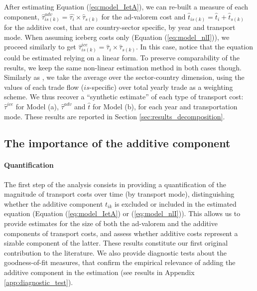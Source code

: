 \documentclass[a4paper,11pt]{article}
\begin{document}


After estimating Equation (\ref{eq:model_IetA}), we can re-built a measure of each component, $\widehat{\tau}^{adv}_{is(k)} = \widehat{\tau_{i}} \times \widehat{\tau}_{s(k)}$ for the ad-valorem cost and $\widehat{t}_{is(k)} = \widehat{t}_{i} + \widehat{t}_{s(k)}$ for the additive cost, that are country-sector specific, by year and transport mode.
When assuming iceberg costs only (Equation (\ref{eq:model_nlI})), we proceed similarly to get $\widehat{\tau}^{ice}_{is(k)} = \widehat{\tau}_{i} \times \widehat{\tau}_{s(k)}$.
In this case, notice that the equation could be estimated relying on a linear form.
To preserve comparability of the results, we keep the same non-linear estimation method in both cases though.
Similarly as \citet{Irrazabal_2015}, we take the average over the sector-country dimension, using the values of each trade flow ($is$-specific) over total yearly trade as a weighting scheme.
We thus recover a ``synthetic estimate'' of each type of transport cost: $\widehat{\tau}^{ice}$ for Model (a), $\widehat{\tau}^{adv}$ and $\widehat{t}$ for Model (b), for each year and transportation mode.
These results are reported in Section \ref{sec:results_decomposition}.


\subsection{The importance of the additive component \label{sec:results_decomposition}}

\paragraph{Quantification} The first step of the analysis consists in providing a quantification of the magnitude of transport costs over time (by transport mode), distinguishing whether the additive component $t_{ik}$ is excluded or included in the estimated equation (Equation (\ref{eq:model_IetA}) or (\ref{eq:model_nlI})).
This allows us to provide estimates for the size of both the ad-valorem and the additive components of transport costs, and assess whether additive costs represent a sizable component of the latter.
These results constitute our first original contribution to the literature.
We also provide diagnostic tests about the goodness-of-fit measures, that confirm the empirical relevance of adding the additive component in the estimation (see results in Appendix \ref{app:diagnostic_test}).\smallskip
\end{document}
